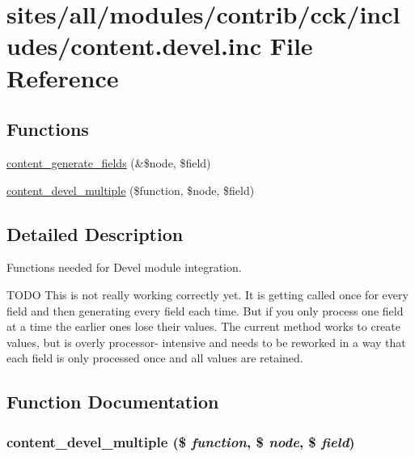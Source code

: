 \hypertarget{content_8devel_8inc}{
\section{sites/all/modules/contrib/cck/includes/content.devel.inc File Reference}
\label{content_8devel_8inc}
}
\subsection*{Functions}
\begin{CompactItemize}
\item 
\hyperlink{content_8devel_8inc_91c3f71a6d3bc64f29e75cd81d9b72d0}{content\_\-generate\_\-fields} (\&\$node, \$field)
\item 
\hyperlink{content_8devel_8inc_c8b4eddf0f0ddaa44fc84c2f5a7cffa6}{content\_\-devel\_\-multiple} (\$function, \$node, \$field)
\end{CompactItemize}


\subsection{Detailed Description}
Functions needed for Devel module integration.

TODO This is not really working correctly yet. It is getting called once for every field and then generating every field each time. But if you only process one field at a time the earlier ones lose their values. The current method works to create values, but is overly processor- intensive and needs to be reworked in a way that each field is only processed once and all values are retained. 

\subsection{Function Documentation}
\hypertarget{content_8devel_8inc_c8b4eddf0f0ddaa44fc84c2f5a7cffa6}{
\subsubsection[{content\_\-devel\_\-multiple}]{\setlength{\rightskip}{0pt plus 5cm}content\_\-devel\_\-multiple (\$ {\em function}, \/  \$ {\em node}, \/  \$ {\em field})}}
\label{content_8devel_8inc_c8b4eddf0f0ddaa44fc84c2f5a7cffa6}


